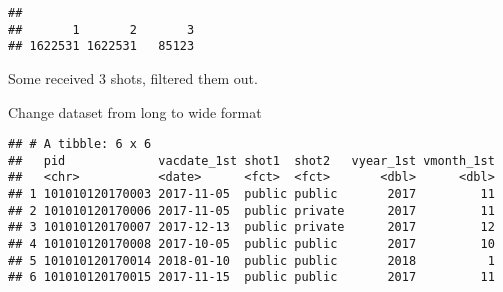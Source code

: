 \documentclass[
]{article}
\newenvironment{Shaded}{\begin{snugshade}}{\end{snugshade}}
\newcommand{\AttributeTok}[1]{\textcolor[rgb]{0.77,0.63,0.00}{#1}}
\newcommand{\CommentTok}[1]{\textcolor[rgb]{0.56,0.35,0.01}{\textit{#1}}}
\newcommand{\DecValTok}[1]{\textcolor[rgb]{0.00,0.00,0.81}{#1}}
\newcommand{\FunctionTok}[1]{\textcolor[rgb]{0.00,0.00,0.00}{#1}}
\newcommand{\NormalTok}[1]{#1}
\newcommand{\OtherTok}[1]{\textcolor[rgb]{0.56,0.35,0.01}{#1}}
\newcommand{\SpecialCharTok}[1]{\textcolor[rgb]{0.00,0.00,0.00}{#1}}
\newcommand{\StringTok}[1]{\textcolor[rgb]{0.31,0.60,0.02}{#1}}
\begin{document}
\begin{verbatim}
## 
##       1       2       3 
## 1622531 1622531   85123
\end{verbatim}

Some received 3 shots, filtered them out.

\begin{Shaded}
\end{Shaded}

Change dataset from long to wide format

\begin{Shaded}
\end{Shaded}

\begin{verbatim}
## # A tibble: 6 x 6
##   pid             vacdate_1st shot1  shot2   vyear_1st vmonth_1st
##   <chr>           <date>      <fct>  <fct>       <dbl>      <dbl>
## 1 101010120170003 2017-11-05  public public       2017         11
## 2 101010120170006 2017-11-05  public private      2017         11
## 3 101010120170007 2017-12-13  public private      2017         12
## 4 101010120170008 2017-10-05  public public       2017         10
## 5 101010120170014 2018-01-10  public public       2018          1
## 6 101010120170015 2017-11-15  public public       2017         11
\end{verbatim}
\end{document}
